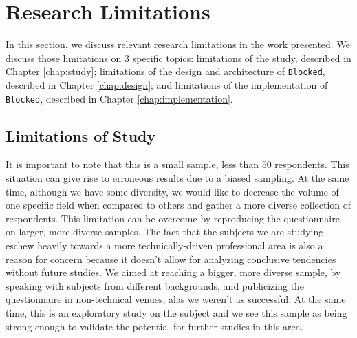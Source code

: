 \section{Research Limitations}
\label{sec:eval-limitations}

In this section, we discuss relevant research limitations in the work presented. We discuss those limitations on 3 specific topics: limitations of the study, described in Chapter \ref{chap:study}; limitations of the design and architecture of \texttt{Blocked}, described in Chapter \ref{chap:design}; and limitations of the implementation of \texttt{Blocked}, described in Chapter \ref{chap:implementation}.

\subsection{Limitations of Study}

It is important to note that this is a small sample, less than 50 respondents. This situation can give rise to erroneous results due to a biased sampling. At the same time, although we have some diversity, we would like to decrease the volume of one specific field when compared to others and gather a more diverse collection of respondents. This limitation can be overcome by reproducing the questionnaire on larger, more diverse samples. The fact that the subjects we are studying eschew heavily towards a more technically-driven professional area is also a reason for concern because it doesn't allow for analyzing conclusive tendencies without future studies. We aimed at reaching a bigger, more diverse sample, by speaking with subjects from different backgrounds, and publicizing the questionnaire in non-technical venues, alas we weren't as successful. At the same time, this is an exploratory study on the subject and we see this sample as being strong enough to validate the potential for further studies in this area.

